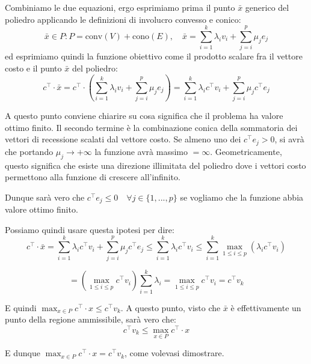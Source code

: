 \documentclass[a4paper,11pt]{article}
\begin{document}
Combiniamo le due equazioni, ergo esprimiamo prima il punto $\bar{x}$ generico del poliedro applicando le definizioni di involucro convesso e conico:
$$
\bar{x} \in P : P = \mathrm{conv}(V) + \mathrm{cono}(E), \quad \bar{x} = \sum_{i=1}^k \lambda_i v_i + \sum_{j=i}^p \mu_j e_j
$$
ed esprimiamo quindi la funzione obiettivo come il prodotto scalare fra il vettore costo e il punto $\bar{x}$ del poliedro:
$$
c^\intercal \cdot \bar{x} = c^\intercal \cdot \left( \sum_{i=1}^k \lambda_i v_i + \sum_{j=i}^p \mu_j e_j \right) = \sum_{i=1}^k \lambda_i c^\intercal v_i + \sum_{j=i}^p \mu_j c^\intercal e_j
$$

A questo punto conviene chiarire su cosa significa che il problema ha valore ottimo finito.
Il secondo termine è la combinazione conica della sommatoria dei vettori di recessione scalati dal vettore costo.
Se almeno uno dei $c^\intercal e_j > 0$, si avrà che portando $\mu_j \rightarrow +\infty$ la funzione avrà massimo $= \infty$.
Geometricamente, questo significa che esiste una direzione illimitata del poliedro dove i vettori costo permettono alla funzione di crescere all'infinito.

Dunque sarà vero che $c^\intercal e_j \leq 0 \quad \forall j \in \{ 1, ..., p \}$ se vogliamo che la funzione abbia valore ottimo finito.

Possiamo quindi usare questa ipotesi per dire:
$$
c^\intercal \cdot \bar{x} = \sum_{i=1}^k \lambda_i c^\intercal v_i + \sum_{j=i}^p \mu_j c^\intercal e_j \leq \sum_{i=1}^k \lambda_i c^\intercal v_i \leq \sum_{i=1}^k \max_{1 \leq i \leq p} \left(\lambda_i c^\intercal v_i\right) 
$$

$$
= \left( \max_{1 \leq i \leq p} c^\intercal v_i\right) \sum_{i=1}^k \lambda_i = \max_{1\leq i \leq p} c^\intercal v_i = c^\intercal v_k
$$

E quindi $\max_{x \in P} c^\intercal \cdot x \leq c^\intercal v_k$.
A questo punto, visto che $\bar{x}$ è effettivamente un punto della regione ammissibile, sarà vero che:
$$
c^\intercal v_k \leq \max_{x \in P} c^\intercal \cdot x
$$

E dunque $\max_{x \in P} c^\intercal \cdot x = c^\intercal v_k$, come volevasi dimostrare. 
\end{document}
